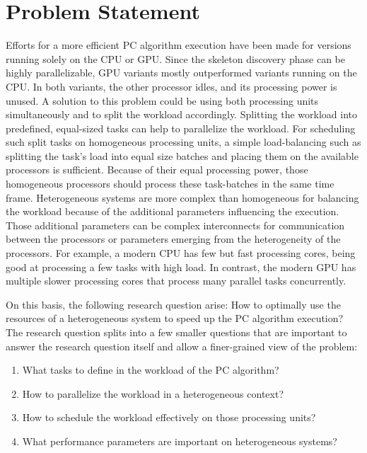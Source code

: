 \chapter{Problem Statement}
\label{chap:problem_statement}
Efforts for a more efficient PC algorithm execution have been made for versions running solely on the CPU or GPU. Since the skeleton discovery phase can be highly parallelizable, GPU variants mostly outperformed variants running on the CPU. In both variants, the other processor idles, and its processing power is unused. A solution to this problem could be using both processing units simultaneously and to split the workload accordingly.
Splitting the workload into predefined, equal-sized tasks can help to parallelize the workload. For scheduling such split tasks on homogeneous processing units, a simple load-balancing such as splitting the task's load into equal size batches and placing them on the available processors is sufficient.
Because of their equal processing power, those homogeneous processors should process these task-batches in the same time frame.
Heterogeneous systems are more complex than homogeneous for balancing the workload because of the additional parameters influencing the execution. Those additional parameters can be complex interconnects for communication between the processors or parameters emerging from the heterogeneity of the processors. For example, a modern CPU has few but fast processing cores, being good at processing a few tasks with high load. In contrast, the modern GPU has multiple slower processing cores that process many parallel tasks concurrently.

On this basis, the following research question arise: How to optimally use the resources of a heterogeneous system to speed up the PC algorithm execution?
The research question splits into a few smaller questions that are important to answer the research question itself and allow a finer-grained view of the problem:

\begin{enumerate}
  \item What tasks to define in the workload of the PC algorithm?
  \item How to parallelize the workload in a heterogeneous context?
  \item How to schedule the workload effectively on those processing units?
  \item What performance parameters are important on heterogeneous systems?
\end{enumerate}


